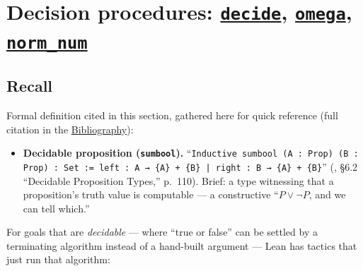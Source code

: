\section{\texorpdfstring{Decision procedures: \href{https://lean-lang.org/doc/reference/latest/Tactic-Proofs/Tactic-Reference/}{\texttt{decide}}, \href{https://lean-lang.org/doc/reference/latest/Tactic-Proofs/Tactic-Reference/}{\texttt{omega}}, \href{https://lean-lang.org/doc/reference/latest/Tactic-Proofs/Tactic-Reference/}{\texttt{norm\_num}}}{Decision procedures: decide, omega, norm\_num}}\label{sec:12-working-efficiently:02-decision-procedures:1}

\subsection{Recall}\label{sec:12-working-efficiently:02-decision-procedures:2}

Formal definition cited in this section, gathered here for quick reference (full citation in the \hyperref[sec:root:bibliography:1]{Bibliography}):

\begin{itemize}
\tightlist
\item
  \textbf{Decidable proposition (\texttt{sumbool}).} ``\texttt{Inductive sumbool (A : Prop) (B : Prop) : Set := left : A → \{A\} + \{B\} | right : B → \{A\} + \{B\}}'' (\cite{Chlipala2013}, §6.2 ``Decidable Proposition Types,'' p.~110). Brief: a type witnessing that a proposition's truth value is computable --- a constructive ``\(P \vee \neg P\), and we can tell which.''
\end{itemize}

For goals that are \emph{decidable} --- where ``true or false'' can be settled by a terminating algorithm instead of a hand-built argument --- Lean has tactics that just run that algorithm:

